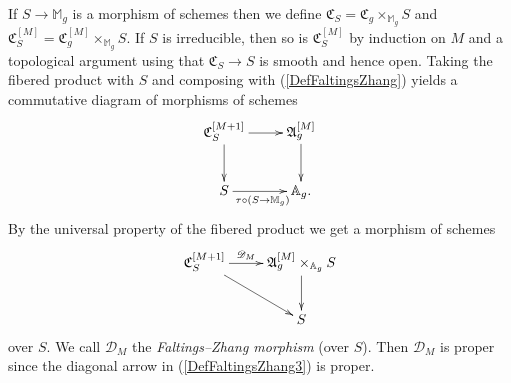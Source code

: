 If $S\rightarrow \mathbb{M}_g$ is a morphism of schemes then we define
$\mathfrak{C}_S = \mathfrak{C}_g \times_{\mathbb{M}_g} S$ and
$\mathfrak{C}_S^{[M]} = \mathfrak{C}_g^{[M]}\times_{\mathbb{M}_g} S$.
If $S$ is irreducible, then so is $\mathfrak{C}_S^{[M]}$ by induction
on $M$ and a topological argument using that
$\mathfrak{C}_S\rightarrow S$ is smooth and hence open.
Taking the fibered product with $S$  and composing with (\ref{DefFaltingsZhang})
yields a commutative diagram of morphisms of schemes
\begin{equation*}
  \begin{aligned}
    \xymatrix{
      \mathfrak{C}_S^{[M+1]}\ar[r] \ar[d] &
      \mathfrak{A}_g^{[M]}
      \ar[d] \\  
      S\ar[r]_{\tau\circ(S\rightarrow\mathbb{M}_g)} & \mathbb{A}_g.
    }
  \end{aligned}
\end{equation*}
By the
universal property
of the fibered product we get a morphism of schemes 
\begin{equation}
  \label{DefFaltingsZhang3}
  \begin{aligned}
    \xymatrix{
      \mathfrak{C}_S^{[M+1]}\ar[r]^-{\mathscr{D}_{M}}
\ar[dr]  &
      \mathfrak{A}_g^{[M]}      \times_{\mathbb{A}_g} S
      \ar[d] \\  
      & S
    }
  \end{aligned}
\end{equation}
over $S$. We call $\mathscr{D}_{M}$ the \textit{Faltings--Zhang morphism} (over
$S$).
Then $\mathscr{D}_{M}$  is proper since the diagonal arrow in
(\ref{DefFaltingsZhang3}) is proper.

